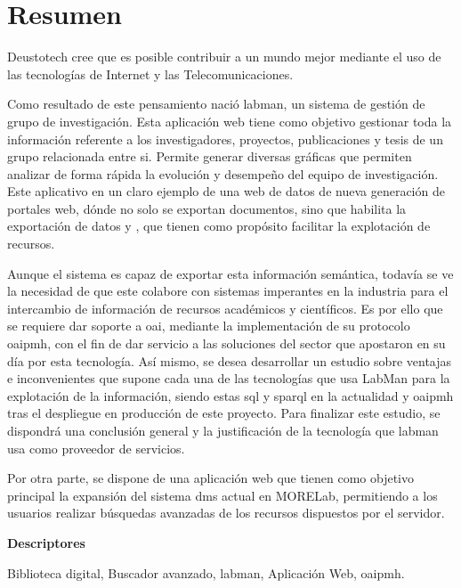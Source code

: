 \chapter*{Resumen}

Deustotech cree que es posible contribuir a un mundo mejor mediante el uso de
las tecnologías de Internet y las Telecomunicaciones.

Como resultado de este pensamiento nació \acrshort{labman}, un sistema de gestión de grupo de investigación. Esta aplicación web tiene como objetivo gestionar toda la información referente a los investigadores, proyectos, publicaciones y tesis de un grupo relacionada entre si. Permite 
generar diversas gráficas que permiten analizar de forma rápida la evolución y desempeño del equipo
de investigación.
Este aplicativo en un claro ejemplo de una web de datos de nueva generación de portales web, dónde
no solo se exportan documentos, sino que habilita la exportación de datos y , que
tienen como propósito facilitar la explotación de recursos.

Aunque el sistema es capaz de exportar esta información semántica, todavía se ve la necesidad de que este colabore con sistemas imperantes en la industria para el intercambio de información de recursos académicos y científicos.
Es por ello que se requiere dar soporte a \acrshort{oai}, mediante la implementación de su protocolo \acrshort{oaipmh}, con el fin de dar servicio a las soluciones del sector que apostaron en su día por esta tecnología. Así mismo, se desea desarrollar un estudio sobre ventajas e inconvenientes que supone cada una de las tecnologías que usa LabMan para la explotación de la información, siendo estas \acrshort{sql} y \acrshort{sparql} en la actualidad y \acrshort{oaipmh} tras el despliegue en producción de este proyecto. Para finalizar este estudio, se dispondrá una conclusión general y la justificación de la tecnología que \acrshort{labman} usa como proveedor de servicios.

Por otra parte, se dispone de una aplicación web que tienen como objetivo principal la expansión
del sistema \acrshort{dms} actual en MORELab, permitiendo a los usuarios realizar búsquedas avanzadas de los recursos dispuestos por el servidor.

\vspace{2em}

{\Large\bfseries\sffamily Descriptores}
\vspace{3\medskipamount}

Biblioteca digital, Buscador avanzado, \acrshort{labman}, Aplicación Web, \acrshort{oaipmh}.